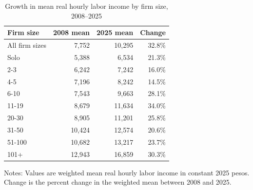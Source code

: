 \begin{table}[!htbp]
  \centering
  \caption{Growth in mean real hourly labor income by firm size, 2008--2025}
  \label{tab:descriptive-wage-growth-2008-2025}
  \small
  \begin{tabular}{lrrr}
    \toprule
    Firm size & 2008 mean & 2025 mean & Change \\
    \midrule
    All firm sizes & 7,752 & 10,295 & 32.8\% \\
    Solo & 5,388 & 6,534 & 21.3\% \\
    2-3 & 6,242 & 7,242 & 16.0\% \\
    4-5 & 7,196 & 8,242 & 14.5\% \\
    6-10 & 7,543 & 9,663 & 28.1\% \\
    11-19 & 8,679 & 11,634 & 34.0\% \\
    20-30 & 8,905 & 11,201 & 25.8\% \\
    31-50 & 10,424 & 12,574 & 20.6\% \\
    51-100 & 10,682 & 13,217 & 23.7\% \\
    101+ & 12,943 & 16,859 & 30.3\% \\
    \bottomrule
  \end{tabular}
  \vspace{0.3em}
  \begin{minipage}{0.95\textwidth}
  \footnotesize
  Notes: Values are weighted mean real hourly labor income in constant 2025 pesos. Change is the percent change in the weighted mean between 2008 and 2025.
  \end{minipage}
\end{table}
